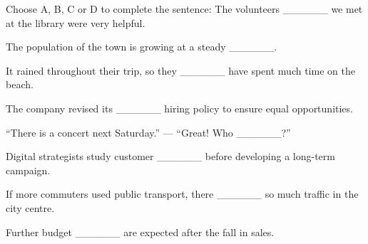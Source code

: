 
\begin{ex}
Choose A, B, C or D to complete the sentence: The volunteers ______ we met at the library were very helpful.
\end{ex}

\begin{ex}
The population of the town is growing at a steady ______.
\end{ex}

\begin{ex}
It rained throughout their trip, so they ______ have spent much time on the beach.
\end{ex}

\begin{ex}
The company revised its ______ hiring policy to ensure equal opportunities.
\end{ex}

\begin{ex}
“There is a concert next Saturday.” — “Great! Who ______?”
\end{ex}

\begin{ex}
Digital strategists study customer ______ before developing a long-term campaign.
\end{ex}

\begin{ex}
If more commuters used public transport, there ______ so much traffic in the city centre.
\end{ex}

\begin{ex}
Further budget ______ are expected after the fall in sales.
\end{ex}

